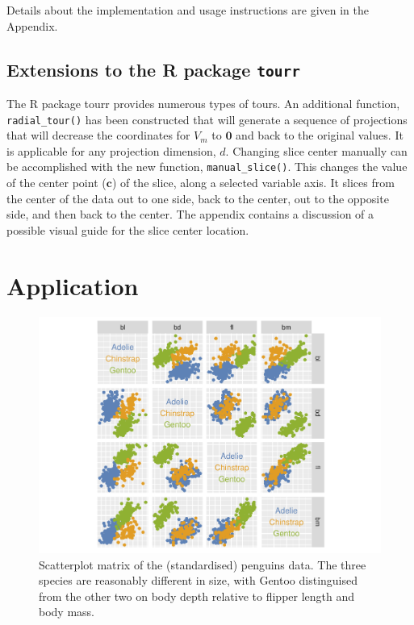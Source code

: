 \documentclass[]{interact}
\theoremstyle{plain}%
\theoremstyle{definition}
\theoremstyle{remark}
\begin{document}
Details about the implementation and usage instructions are given in the
Appendix.

\hypertarget{extensions-to-the-r-package-tourr}{%
\subsection{\texorpdfstring{Extensions to the R package
\texttt{tourr}}{Extensions to the R package tourr}}\label{extensions-to-the-r-package-tourr}}

The R package tourr \citep{tourr} provides numerous types of tours. An
additional function, \texttt{radial\_tour()} has been constructed that
will generate a sequence of projections that will decrease the
coordinates for \(V_m\) to \(\boldsymbol{0}\) and back to the original
values. It is applicable for any projection dimension, \(d\). Changing
slice center manually can be accomplished with the new function,
\texttt{manual\_slice()}. This changes the value of the center point
(\(\mathbf{c}\)) of the slice, along a selected variable axis. It slices
from the center of the data out to one side, back to the center, out to
the opposite side, and then back to the center. The appendix contains a
discussion of a possible visual guide for the slice center location.

\hypertarget{sec:examples}{%
\section{Application}\label{sec:examples}}

\begin{figure}

{\centering \includegraphics[width=0.6\linewidth]{arxiv_files/figure-latex/penguins-scatmat-1} 

}

\caption{Scatterplot matrix of the (standardised) penguins data. The three species are reasonably different in size, with Gentoo distinguised from the other two on body depth relative to flipper length and body mass.}\label{fig:penguins-scatmat}
\end{figure}
\end{document}
